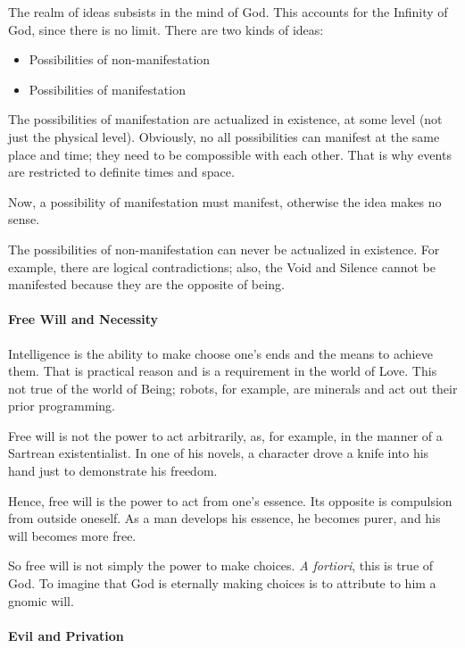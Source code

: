 The realm of ideas subsists in the mind of God. This accounts for the Infinity of God, since there is no limit. There are two kinds of ideas:

\begin{itemize}


\item Possibilities of non-manifestation

\item Possibilities of manifestation
\end{itemize}


The possibilities of manifestation are actualized in existence, at some level (not just the physical level). Obviously, no all possibilities can manifest at the same place and time; they need to be compossible with each other. That is why events are restricted to definite times and space.

Now, a possibility of manifestation must manifest, otherwise the idea makes no sense.

The possibilities of non-manifestation can never be actualized in existence. For example, there are logical contradictions; also, the Void and Silence cannot be manifested because they are the opposite of being.

\paragraph{Free Will and Necessity}


Intelligence is the ability to make choose one's ends and the means to achieve them. That is practical reason and is a requirement in the world of Love. This not true of the world of Being; robots, for example, are minerals and act out their prior programming.

Free will is not the power to act arbitrarily, as, for example, in the manner of a Sartrean existentialist. In one of his novels, a character drove a knife into his hand just to demonstrate his freedom.

Hence, free will is the power to act from one's essence. Its opposite is compulsion from outside oneself. As a man develops his essence, he becomes purer, and his will becomes more free.

So free will is not simply the power to make choices. \emph{A fortiori}, this is true of God. To imagine that God is eternally making choices is to attribute to him a gnomic will.

\paragraph{Evil and Privation}


